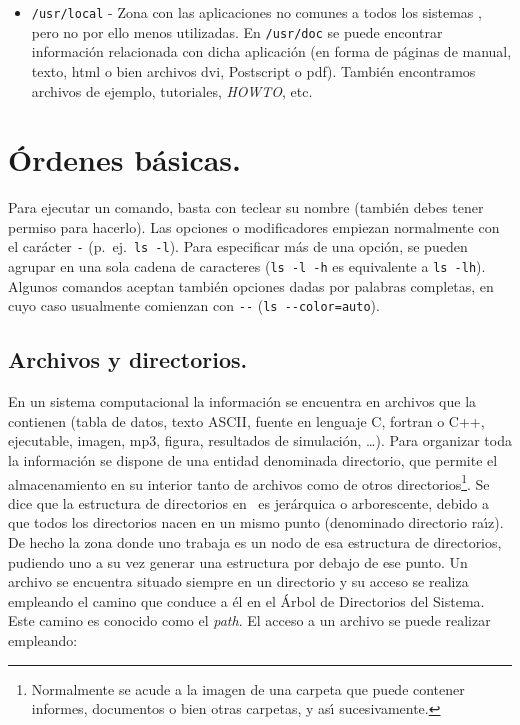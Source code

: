 \begin{itemize}
\begin{itemize}
\item \verb+tty+: hacen referencia a cada una de las consolas
  virtuales. Como es de suponerse, \verb+tty1+ ser{\'a} la primera consola
  virtual, \verb+tty2+ la segunda, etc.

\end{itemize}

\item \verb+/usr/local+ - Zona con las aplicaciones no comunes a todos
  los sistemas \unix, pero no por ello menos utilizadas. En
  \verb+/usr/doc+ se puede encontrar informaci{\'o}n relacionada con
  dicha aplicaci{\'o}n (en forma de p{\'a}ginas de manual, texto, html o bien
  archivos dvi, Postscript o pdf). Tambi{\'e}n encontramos archivos de ejemplo,
  tutoriales, {\it HOWTO}, etc.

\end{itemize}

\section{\'Ordenes b{\'a}sicas.}

Para ejecutar un comando, basta con teclear su nombre (tambi{\'e}n debes
tener permiso para hacerlo). Las opciones o modificadores empiezan
normalmente con el car{\'a}cter \verb+-+ (p.\ ej.\ \verb+ls -l+).  
Para especificar m\'as de
una opci\'on, se pueden agrupar en una sola cadena de caracteres
(\verb+ls -l -h+ es equivalente a \verb+ls -lh+). Algunos comandos
aceptan tambi\'en opciones dadas por palabras completas, en cuyo caso
usualmente comienzan con \verb+--+ (\verb+ls --color=auto+). 

\subsection{Archivos y directorios.}

En un sistema computacional la informaci{\'o}n se encuentra en archivos
que la contienen (tabla de datos, texto {\sc ASCII}, fuente en
lenguaje C, fortran o C++, ejecutable, imagen, mp3, figura, resultados
de simulaci{\'o}n, \ldots ).  Para organizar toda la informaci{\'o}n se dispone de
una entidad denominada directorio, que permite el almacenamiento en su
interior tanto de archivos como de otros
directorios\footnote{Normalmente se acude a la imagen de una carpeta
  que puede contener informes, documentos o bien otras carpetas, y as{\'\i}
  sucesivamente.}.  Se dice que la estructura de directorios en \unix\ 
es jer{\'a}rquica o arborescente, debido a que todos los directorios nacen
en un mismo punto (denominado directorio ra{\'\i}z).  De hecho la zona
donde uno trabaja es un nodo de esa estructura de directorios,
pudiendo uno a su vez generar una estructura por debajo de ese punto.
Un archivo se encuentra situado siempre en un directorio y su acceso
se realiza empleando el camino que conduce a {\'e}l en el {\'A}rbol de
Directorios del Sistema. Este camino es conocido como el {\it path}.
El acceso a un archivo se puede realizar empleando:

